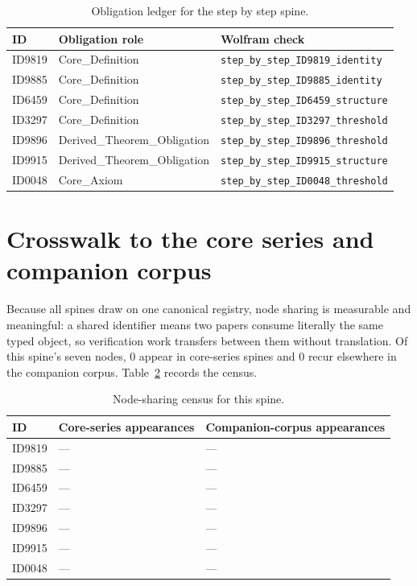 \documentclass[11pt]{article}
\theoremstyle{remark}
\begin{document}
\begin{table}[ht]
\centering
\small
\caption{Obligation ledger for the step by step spine.}
\label{tab:obligations}
\begin{tabular}{llp{6.2cm}}
\toprule
ID & Obligation role & Wolfram check \\
\midrule
ID9819 & Core\_Definition & \texttt{step\_by\_step\_ID9819\_identity} \\
ID9885 & Core\_Definition & \texttt{step\_by\_step\_ID9885\_identity} \\
ID6459 & Core\_Definition & \texttt{step\_by\_step\_ID6459\_structure} \\
ID3297 & Core\_Definition & \texttt{step\_by\_step\_ID3297\_threshold} \\
ID9896 & Derived\_Theorem\_Obligation & \texttt{step\_by\_step\_ID9896\_threshold} \\
ID9915 & Derived\_Theorem\_Obligation & \texttt{step\_by\_step\_ID9915\_structure} \\
ID0048 & Core\_Axiom & \texttt{step\_by\_step\_ID0048\_threshold} \\
\bottomrule
\end{tabular}
\end{table}

\section{Crosswalk to the core series and companion corpus}
\label{sec:crosswalk}

Because all spines draw on one canonical registry, node sharing is measurable and meaningful: a shared identifier means two papers consume literally the same typed object, so verification work transfers between them without translation. Of this spine's seven nodes, 0 appear in core-series spines and 0 recur elsewhere in the companion corpus. Table~\ref{tab:crosswalk} records the census.

\begin{table}[ht]
\centering
\small
\caption{Node-sharing census for this spine.}
\label{tab:crosswalk}
\begin{tabular}{lp{4.4cm}p{6.6cm}}
\toprule
ID & Core-series appearances & Companion-corpus appearances \\
\midrule
ID9819 & --- & --- \\
ID9885 & --- & --- \\
ID6459 & --- & --- \\
ID3297 & --- & --- \\
ID9896 & --- & --- \\
ID9915 & --- & --- \\
ID0048 & --- & --- \\
\bottomrule
\end{tabular}
\end{table}
\end{document}

